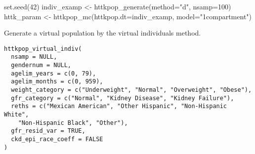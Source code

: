 \documentclass[a4paper]{book}
\begin{document}
%
\begin{Examples}
\begin{ExampleCode}

set.seed(42)
indiv_examp <- httkpop_generate(method="d", nsamp=100)
httk_param <- httkpop_mc(httkpop.dt=indiv_examp, 
model="1compartment")

\end{ExampleCode}
\end{Examples}
%
\begin{Description}\relax
Generate a virtual population by the virtual individuals method.
\end{Description}
%
\begin{Usage}
\begin{verbatim}
httkpop_virtual_indiv(
  nsamp = NULL,
  gendernum = NULL,
  agelim_years = c(0, 79),
  agelim_months = c(0, 959),
  weight_category = c("Underweight", "Normal", "Overweight", "Obese"),
  gfr_category = c("Normal", "Kidney Disease", "Kidney Failure"),
  reths = c("Mexican American", "Other Hispanic", "Non-Hispanic White",
    "Non-Hispanic Black", "Other"),
  gfr_resid_var = TRUE,
  ckd_epi_race_coeff = FALSE
)
\end{verbatim}
\end{Usage}
%
\end{document}
